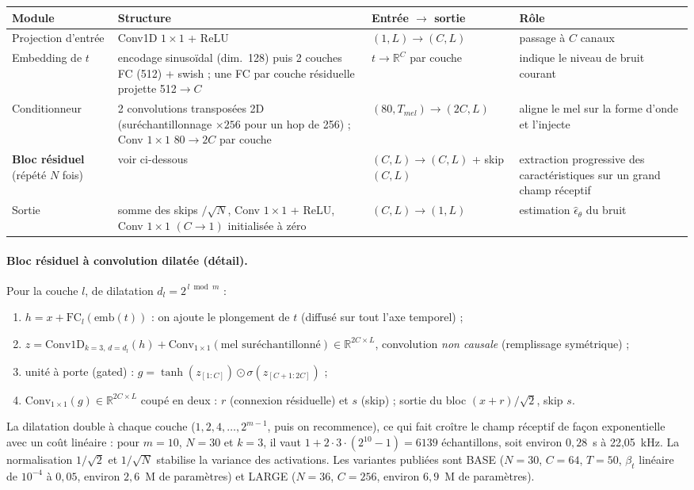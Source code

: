 \begin{center}\small
\begin{tabular}{p{3.1cm}p{4.2cm}p{3.1cm}p{3.6cm}}\toprule
Module & Structure & Entrée $\to$ sortie & Rôle\\\midrule
Projection d'entrée & Conv1D $1{\times}1$ + ReLU & $(1,L)\to(C,L)$ & passage à $C$ canaux\\
Embedding de $t$ & encodage sinusoïdal (dim.\ 128) puis 2 couches FC (512) + swish ; une FC par couche résiduelle projette 512$\to C$ & $t\to\mathbb R^{C}$ par couche & indique le niveau de bruit courant\\
Conditionneur & 2 convolutions transposées 2D (suréchantillonnage $\times256$ pour un hop de 256) ; Conv $1{\times}1$ $80\to2C$ par couche & $(80,T_{mel})\to(2C,L)$ & aligne le mel sur la forme d'onde et l'injecte\\
\textbf{Bloc résiduel} (répété $N$ fois) & voir ci-dessous & $(C,L)\to(C,L)$ + skip $(C,L)$ & extraction progressive des caractéristiques sur un grand champ réceptif\\
Sortie & somme des skips $/\sqrt N$, Conv $1{\times}1$ + ReLU, Conv $1{\times}1$ $(C\to1)$ initialisée à zéro & $(C,L)\to(1,L)$ & estimation $\hat\epsilon_\theta$ du bruit\\\bottomrule
\end{tabular}
\end{center}

\paragraph{Bloc résiduel à convolution dilatée (détail).} Pour la couche $l$, de dilatation $d_l=2^{\,l\bmod m}$ :
\begin{enumerate}
 \item $h=x+\mathrm{FC}_l(\text{emb}(t))$ : on ajoute le plongement de $t$ (diffusé sur tout l'axe temporel) ;
 \item $z=\mathrm{Conv1D}_{k=3,\,d=d_l}(h)+\mathrm{Conv}_{1\times1}(\text{mel suréchantillonné})\in\mathbb R^{2C\times L}$, convolution \emph{non causale} (remplissage symétrique) ;
 \item unité à porte (gated) : $g=\tanh(z_{[1:C]})\odot\sigma(z_{[C+1:2C]})$ ;
 \item $\mathrm{Conv}_{1\times1}(g)\in\mathbb R^{2C\times L}$ coupé en deux : $r$ (connexion résiduelle) et $s$ (skip) ; sortie du bloc $(x+r)/\sqrt2$, skip $s$.
\end{enumerate}
La dilatation double à chaque couche ($1,2,4,\dots,2^{m-1}$, puis on recommence), ce qui fait croître le champ réceptif de façon exponentielle avec un coût linéaire : pour $m=10$, $N=30$ et $k=3$, il vaut $1+2\cdot3\cdot(2^{10}-1)=6139$ échantillons, soit environ $0{,}28$~s à 22,05~kHz. La normalisation $1/\sqrt2$ et $1/\sqrt N$ stabilise la variance des activations. Les variantes publiées sont BASE ($N=30$, $C=64$, $T=50$, $\beta_t$ linéaire de $10^{-4}$ à $0{,}05$, environ $2{,}6$~M de paramètres) et LARGE ($N=36$, $C=256$, environ $6{,}9$~M de paramètres).
